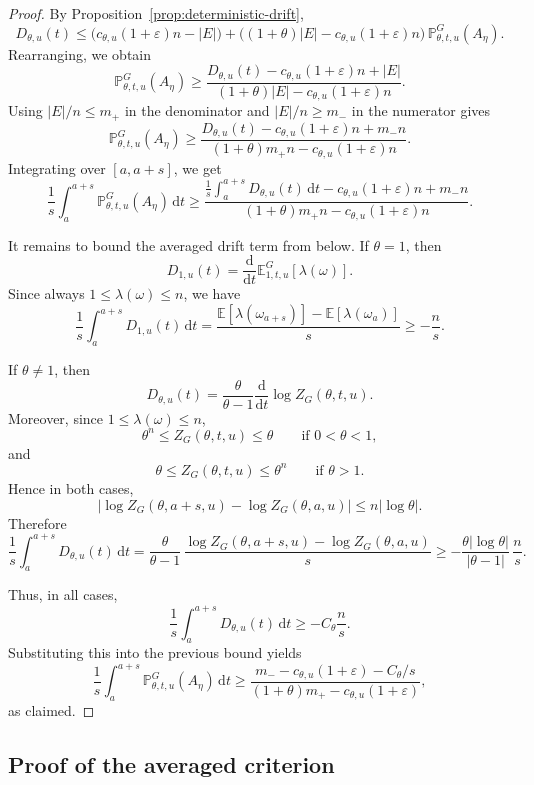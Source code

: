 \documentclass[11pt]{article}
\theoremstyle{remark}
\theoremstyle{plain}
\newcommand{\Pbb}{\mathbb{P}}
\newcommand{\Ebb}{\mathbb{E}}
\newcommand{\1}{\mathbbm{1}}
\newcommand{\dd}{\mathrm{d}}
\begin{document}
\begin{proof}
By Proposition~\ref{prop:deterministic-drift},
\[
D_{\theta,u}(t)
\le
\bigl(c_{\theta,u}(1+\varepsilon)n-|E|\bigr)
+
\bigl((1+\theta)|E|-c_{\theta,u}(1+\varepsilon)n\bigr)\,
\Pbb^G_{\theta,t,u}(A_\eta).
\]
Rearranging, we obtain
\[
\Pbb^G_{\theta,t,u}(A_\eta)
\ge
\frac{
D_{\theta,u}(t)-c_{\theta,u}(1+\varepsilon)n+|E|
}{
(1+\theta)|E|-c_{\theta,u}(1+\varepsilon)n
}.
\]
Using \(|E|/n\le m_+\) in the denominator and \(|E|/n\ge m_-\) in the numerator gives
\[
\Pbb^G_{\theta,t,u}(A_\eta)
\ge
\frac{
D_{\theta,u}(t)-c_{\theta,u}(1+\varepsilon)n+m_- n
}{
(1+\theta)m_+ n-c_{\theta,u}(1+\varepsilon)n
}.
\]
Integrating over \([a,a+s]\), we get
\[
\frac1s\int_a^{a+s}\Pbb^G_{\theta,t,u}(A_\eta)\,\dd t
\ge
\frac{
\frac1s\int_a^{a+s}D_{\theta,u}(t)\,\dd t
-c_{\theta,u}(1+\varepsilon)n+m_- n
}{
(1+\theta)m_+ n-c_{\theta,u}(1+\varepsilon)n
}.
\]

It remains to bound the averaged drift term from below.
If \(\theta=1\), then
\[
D_{1,u}(t)=\frac{\dd}{\dd t}\Ebb^G_{1,t,u}[\lambda(\omega)].
\]
Since always \(1\le \lambda(\omega)\le n\), we have
\[
\frac1s\int_a^{a+s}D_{1,u}(t)\,\dd t
=
\frac{\Ebb[\lambda(\omega_{a+s})]-\Ebb[\lambda(\omega_a)]}{s}
\ge -\frac{n}{s}.
\]

If \(\theta\neq 1\), then
\[
D_{\theta,u}(t)=\frac{\theta}{\theta-1}\frac{\dd}{\dd t}\log Z_G(\theta,t,u).
\]
Moreover, since \(1\le \lambda(\omega)\le n\),
\[
\theta^n\le Z_G(\theta,t,u)\le \theta
\qquad\text{if }0<\theta<1,
\]
and
\[
\theta\le Z_G(\theta,t,u)\le \theta^n
\qquad\text{if }\theta>1.
\]
Hence in both cases,
\[
\left|
\log Z_G(\theta,a+s,u)-\log Z_G(\theta,a,u)
\right|
\le n|\log\theta|.
\]
Therefore
\[
\frac1s\int_a^{a+s}D_{\theta,u}(t)\,\dd t
=
\frac{\theta}{\theta-1}\,
\frac{\log Z_G(\theta,a+s,u)-\log Z_G(\theta,a,u)}{s}
\ge
-\frac{\theta |\log\theta|}{|\theta-1|}\,\frac{n}{s}.
\]

Thus, in all cases,
\[
\frac1s\int_a^{a+s}D_{\theta,u}(t)\,\dd t
\ge - C_\theta \frac{n}{s}.
\]
Substituting this into the previous bound yields
\[
\frac1s\int_a^{a+s}\Pbb^G_{\theta,t,u}(A_\eta)\,\dd t
\ge
\frac{
m_- - c_{\theta,u}(1+\varepsilon)-C_\theta/s
}{
(1+\theta)m_+ - c_{\theta,u}(1+\varepsilon)
},
\]
as claimed.
\end{proof}

\subsection{Proof of the averaged criterion}
\end{document}
